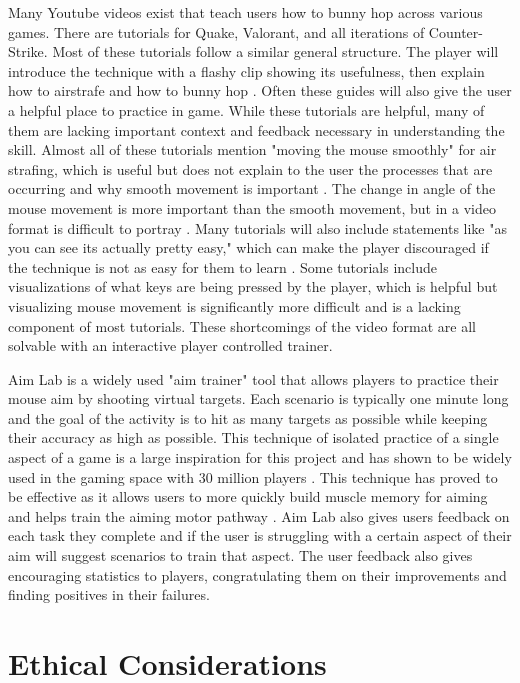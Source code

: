 \documentclass[10pt,twocolumn]{article}
\begin{document}
Many Youtube videos exist that teach users how to bunny hop across various games. There are tutorials for Quake, Valorant, and all iterations of Counter-Strike. Most of these tutorials follow a similar general structure. The player will introduce the technique with a flashy clip showing its usefulness, then explain how to airstrafe and how to bunny hop \cite{QuakeBHopTutorial}. Often these guides will also give the user a helpful place to practice in game. While these tutorials are helpful, many of them are lacking important context and feedback necessary in understanding the skill. Almost all of these tutorials mention "moving the mouse smoothly" for air strafing, which is useful but does not explain to the user the processes that are occurring and why smooth movement is important \cite{HowToBhopCS2}. The change in angle of the mouse movement is more important than the smooth movement, but in a video format is difficult to portray \cite{BhopTutorialValorant}. Many tutorials will also include statements like "as you can see its actually pretty easy," which can make the player discouraged if the technique is not as easy for them to learn \cite{QuakeBHopTutorial}. Some tutorials include visualizations of what keys are being pressed by the player, which is helpful but visualizing mouse movement is significantly more difficult and is a lacking component of most tutorials. These shortcomings of the video format are all solvable with an interactive player controlled trainer.

Aim Lab is a widely used "aim trainer" tool that allows players to practice their mouse aim by shooting virtual targets. Each scenario is typically one minute long and the goal of the activity is to hit as many targets as possible while keeping their accuracy as high as possible. This technique of isolated practice of a single aspect of a game is a large inspiration for this project and has shown to be widely used in the gaming space with 30 million players \cite{STEAMDBAimLabChart}. This technique has proved to be effective as it allows users to more quickly build muscle memory for aiming and helps train the aiming motor pathway \cite{aimTrainingWorks}. Aim Lab also gives users feedback on each task they complete and if the user is struggling with a certain aspect of their aim will suggest scenarios to train that aspect. The user feedback also gives encouraging statistics to players, congratulating them on their improvements and finding positives in their failures.


\section{Ethical Considerations}
\end{document}
